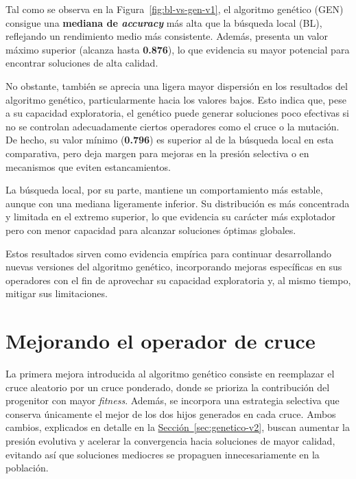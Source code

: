 Tal como se observa en la Figura~\ref{fig:bl-vs-gen-v1}, el algoritmo genético (GEN) consigue una \textbf{mediana de \textit{accuracy}} más alta que la búsqueda local (BL),
reflejando un rendimiento medio más consistente.
Además, presenta un valor máximo superior (alcanza hasta \textbf{0.876}), lo que evidencia su mayor potencial para encontrar soluciones de alta calidad.

No obstante, también se aprecia una ligera mayor dispersión en los resultados del algoritmo genético, particularmente hacia los valores bajos.
Esto indica que, pese a su capacidad exploratoria, el genético puede generar soluciones poco efectivas si no se controlan adecuadamente ciertos operadores como el cruce o la mutación.
De hecho, su valor mínimo (\textbf{0.796}) es superior al de la búsqueda local en esta comparativa,
pero deja margen para mejoras en la presión selectiva o en mecanismos que eviten estancamientos.

La búsqueda local, por su parte, mantiene un comportamiento más estable, aunque con una mediana ligeramente inferior.
Su distribución es más concentrada y limitada en el extremo superior, lo que evidencia su carácter más explotador pero con menor capacidad para alcanzar soluciones óptimas globales.

Estos resultados sirven como evidencia empírica para continuar desarrollando nuevas versiones del algoritmo genético,
incorporando mejoras específicas en sus operadores con el fin de aprovechar su capacidad exploratoria y, al mismo tiempo, mitigar sus limitaciones.

\section{Mejorando el operador de cruce}\label{sec:incorporacion-cruce}
La primera mejora introducida al algoritmo genético consiste en reemplazar el cruce aleatorio por un cruce ponderado,
donde se prioriza la contribución del progenitor con mayor \textit{fitness}.
Además, se incorpora una estrategia selectiva que conserva únicamente el mejor de los dos hijos generados en cada cruce.
Ambos cambios, explicados en detalle en la \hyperref[sec:genetico-v2]{Sección~\ref*{sec:genetico-v2}},
buscan aumentar la presión evolutiva y acelerar la convergencia hacia soluciones de mayor calidad,
evitando así que soluciones mediocres se propaguen innecesariamente en la población.

